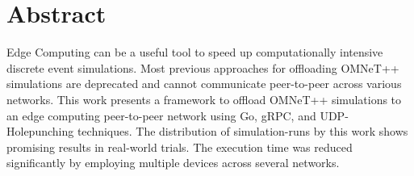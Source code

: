 \chapter*{Abstract}
Edge Computing can be a useful tool to speed up computationally intensive discrete event simulations. Most previous approaches for offloading OMNeT++ simulations are deprecated and cannot communicate peer-to-peer across various networks. This work presents a framework to offload OMNeT++ simulations to an edge computing peer-to-peer network using Go, gRPC, and UDP-Holepunching techniques. The distribution of simulation-runs by this work shows promising results in real-world trials. The execution time was reduced significantly by employing multiple devices across several networks.
